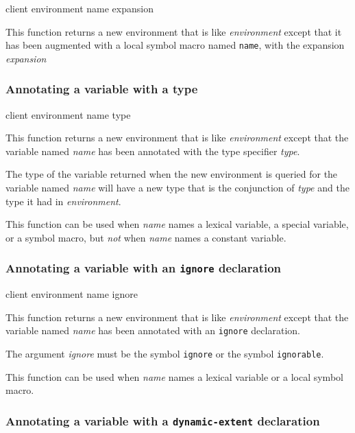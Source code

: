 {\footnotesize
{} {client environment name expansion}
}

This function returns a new environment that is like
\textit{environment} except that it has been augmented with a local
symbol macro named \texttt{name}, with the expansion
\textit{expansion}

\subsubsection{Annotating a variable with a type}
\label{sec-annotating-a-variable-with-a-type}

{\footnotesize
{} {client environment name type}
}

This function returns a new environment that is like
\textit{environment} except that the variable named \textit{name} has
been annotated with the type specifier \textit{type}.

The type of the variable returned when the new environment is queried
for the variable named \textit{name} will have a new type that is the
conjunction of \textit{type} and the type it had in
\textit{environment}.

This function can be used when \textit{name} names a lexical variable,
a special variable, or a symbol macro, but \emph{not}
when \textit{name} names a constant variable.

\subsubsection{Annotating a variable with an \texttt{ignore} declaration}
\label{sec-annotating-a-variable-with-ignore}

{\footnotesize
{} {client environment name ignore}
}

This function returns a new environment that is like
\textit{environment} except that the variable named \textit{name} has
been annotated with an \texttt{ignore} declaration.

The argument \textit{ignore} must be the symbol \texttt{ignore} or the
symbol \texttt{ignorable}.

This function can be used when \textit{name} names a lexical variable
or a local symbol macro.

\subsubsection{Annotating a variable with a \texttt{dynamic-extent} declaration}
\label{sec-annotating-a-variable-with-dynamic-extent}

